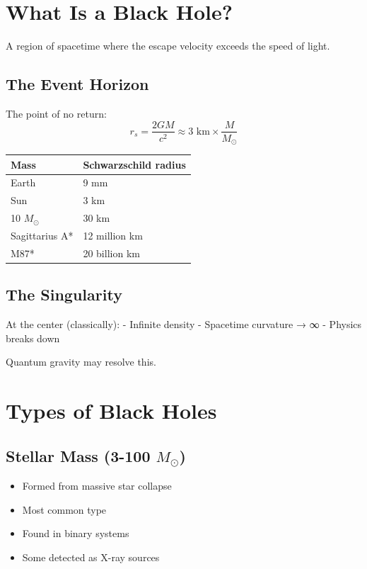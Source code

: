 \documentclass[
  11pt,
  letterpaper,
  twoside,
  openright]{book}
\providecommand{\tightlist}{%
  \setlength{\itemsep}{0pt}\setlength{\parskip}{0pt}}
\begin{document}
\section{What Is a Black Hole?}\label{what-is-a-black-hole}

A region of spacetime where the escape velocity exceeds the speed of
light.

\subsection{The Event Horizon}\label{the-event-horizon}

The point of no return: \[
r_s = \frac{2GM}{c^2} \approx 3 \text{ km} \times \frac{M}{M_\odot}
\]

\begin{longtable}[]{@{}ll@{}}
\toprule\noalign{}
Mass & Schwarzschild radius \\
\midrule\noalign{}
\endhead
\bottomrule\noalign{}
\endlastfoot
Earth & 9 mm \\
Sun & 3 km \\
10 \(M_\odot\) & 30 km \\
Sagittarius A* & 12 million km \\
M87* & 20 billion km \\
\end{longtable}

\subsection{The Singularity}\label{the-singularity}

At the center (classically): - Infinite density - Spacetime curvature →
∞ - Physics breaks down

Quantum gravity may resolve this.

\section{Types of Black Holes}\label{types-of-black-holes}

\subsection{\texorpdfstring{Stellar Mass (3-100
\(M_\odot\))}{Stellar Mass (3-100 M\_\textbackslash odot)}}\label{stellar-mass-3-100-m_odot}

\begin{itemize}
\tightlist
\item
  Formed from massive star collapse
\item
  Most common type
\item
  Found in binary systems
\item
  Some detected as X-ray sources
\end{itemize}
\end{document}
